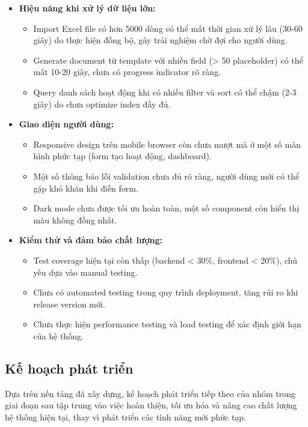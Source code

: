 \begin{itemize}
    \item \textbf{Hiệu năng khi xử lý dữ liệu lớn:}
    \begin{itemize}
        \item Import Excel file có hơn 5000 dòng có thể mất thời gian xử lý lâu (30-60 giây) do thực hiện đồng bộ, gây trải nghiệm chờ đợi cho người dùng.
        \item Generate document từ template với nhiều field (> 50 placeholder) có thể mất 10-20 giây, chưa có progress indicator rõ ràng.
        \item Query danh sách hoạt động khi có nhiều filter và sort có thể chậm (2-3 giây) do chưa optimize index đầy đủ.
    \end{itemize}
    
    \item \textbf{Giao diện người dùng:}
    \begin{itemize}
        \item Responsive design trên mobile browser còn chưa mượt mà ở một số màn hình phức tạp (form tạo hoạt động, dashboard).
        \item Một số thông báo lỗi validation chưa đủ rõ ràng, người dùng mới có thể gặp khó khăn khi điền form.
        \item Dark mode chưa được tối ưu hoàn toàn, một số component còn hiển thị màu không đồng nhất.
    \end{itemize}
    
    \item \textbf{Kiểm thử và đảm bảo chất lượng:}
    \begin{itemize}
        \item Test coverage hiện tại còn thấp (backend < 30\%, frontend < 20\%), chủ yếu dựa vào manual testing.
        \item Chưa có automated testing trong quy trình deployment, tăng rủi ro khi release version mới.
        \item Chưa thực hiện performance testing và load testing để xác định giới hạn của hệ thống.
    \end{itemize}
\end{itemize}

\subsection{Kế hoạch phát triển}

Dựa trên nền tảng đã xây dựng, kế hoạch phát triển tiếp theo của nhóm trong giai đoạn sau tập trung vào việc hoàn thiện, tối ưu hóa và nâng cao chất lượng hệ thống hiện tại, thay vì phát triển các tính năng mới phức tạp.

